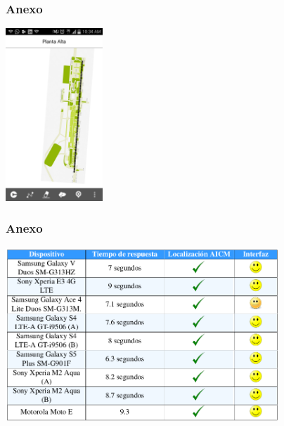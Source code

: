 \documentclass[12pt]{beamer}
\begin{document}
\begin{frame}
	\frametitle{Anexo}
	\begin{center}
		\includegraphics[height=6.5cm]{imagenes/backbone.png}	
	\end{center}
\end{frame}

\begin{frame}
	\frametitle{Anexo}
	\begin{center}
		\includegraphics[height=6.5cm]{imagenes/concurrencia.png}	
	\end{center}
\end{frame}
	
\end{document}

